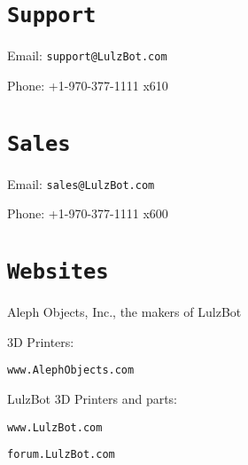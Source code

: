 %
%
%
%
%

\section{\texttt{Support}}
\setlength{\parindent}{0pt}
Email: \texttt{support@LulzBot.com}

Phone: +1-970-377-1111 x610

\section{\texttt{Sales}}

Email: \texttt{sales@LulzBot.com}

Phone: +1-970-377-1111 x600

\section{\texttt{Websites}}

Aleph Objects, Inc., the makers of LulzBot\textsuperscript{\miniscule{\texttrademark}}

3D Printers:

\texttt{www.AlephObjects.com}


LulzBot\textsuperscript{\miniscule{\texttrademark}} 3D Printers and parts:

\texttt{www.LulzBot.com}

\texttt{forum.LulzBot.com}
